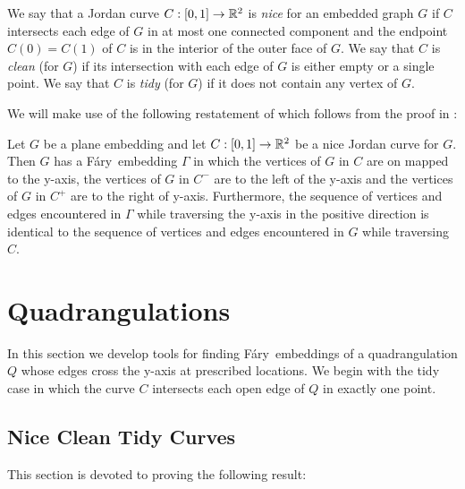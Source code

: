 \documentclass{patmorin}
\newcommand{\Fary}{Fáry}
\begin{document}
We say that a Jordan curve $C:[0,1]\to\mathbb{R}^2$ is \emph{nice} for an embedded
graph $G$ if $C$ intersects each edge of $G$ in at most one connected
component and the endpoint $C(0)=C(1)$ of $C$ is in the interior of the
outer face of $G$.  We say that $C$ is \emph{clean} (for $G$) if its
intersection with each edge of $G$ is either empty or a single point.
We say that $C$ is \emph{tidy} (for $G$) if it does not contain any
vertex of $G$.

We will make use of the following restatement of 
which follows from the proof in \cite{dalozzo.dujmovic.ea:drawing}:
\begin{thm}
   Let $G$ be a plane embedding and let $C:[0,1]\to\mathbb{R}^2$ be a nice
   Jordan curve for $G$.  Then $G$ has a \Fary\ embedding $\Gamma$
   in which the vertices of $G$ in $C$ are on mapped to the y-axis,
   the vertices of $G$ in $C^-$ are to the left of the y-axis and the
   vertices of $G$ in $C^+$ are to the right of y-axis. Furthermore,
   the sequence of vertices and edges encountered in $\Gamma$ while
   traversing the y-axis in the positive direction is identical to the
   sequence of vertices and edges encountered in $G$ while traversing $C$.
\end{thm}




\section{Quadrangulations}

In this section we develop tools for finding \Fary\ embeddings of
a quadrangulation $Q$ whose edges cross the y-axis at prescribed
locations. We begin with the tidy case in which the curve $C$ intersects each
open edge of $Q$ in exactly one point.

\subsection{Nice Clean Tidy Curves}

This section is devoted to proving the following result:
\end{document}
